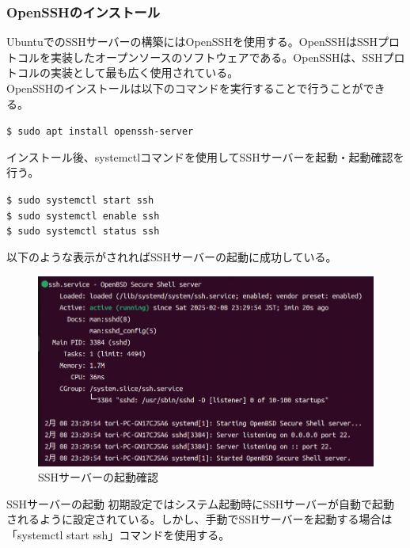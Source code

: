 \documentclass[a4paper, 11pt, dvipdfmx]{jsarticle}
\begin{document}
\subsubsection{OpenSSHのインストール}
UbuntuでのSSHサーバーの構築にはOpenSSHを使用する。OpenSSHはSSHプロトコルを実装したオープンソースのソフトウェアである。OpenSSHは、SSHプロトコルの実装として最も広く使用されている。\\
OpenSSHのインストールは以下のコマンドを実行することで行うことができる。
\begin{terminalbox}
  \verb|$ sudo apt install openssh-server|
\end{terminalbox}
インストール後、systemctlコマンドを使用してSSHサーバーを起動・起動確認を行う。
\begin{terminalbox}
  \verb|$ sudo systemctl start ssh|\\
  \verb|$ sudo systemctl enable ssh|\\
  \verb|$ sudo systemctl status ssh|
\end{terminalbox}
以下のような表示がされればSSHサーバーの起動に成功している。
\begin{figure}[H]
  \centering
  \includegraphics[width=12cm]{images/linux-server/10_2_1-status-ssh.png}
  \caption{SSHサーバーの起動確認}
\end{figure}
\begin{hosokubox}{SSHサーバーの起動}
  初期設定ではシステム起動時にSSHサーバーが自動で起動されるように設定されている。しかし、手動でSSHサーバーを起動する場合は「systemctl start ssh」コマンドを使用する。
\end{hosokubox}
\end{document}
